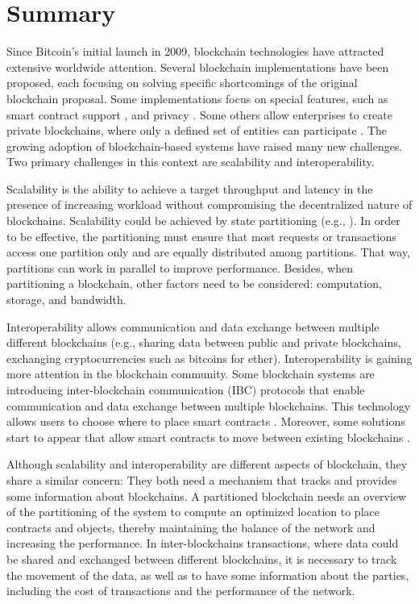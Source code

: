 \newpage
\thispagestyle{empty}
\section{Summary}
Since Bitcoin's initial launch in 2009, blockchain technologies have attracted
extensive worldwide attention. Several blockchain implementations
have been proposed, each focusing on solving specific shortcomings of the original
blockchain proposal. Some implementations focus on special features, such as
smart contract support \cite{buterin2013ethereum, elrom2019neo}, and privacy
\cite{alonso2018monero}. Some others allow enterprises to create private
blockchains, where only a defined set of entities can participate
\cite{androulaki2018hyperledger}. The growing adoption of blockchain-based
systems have raised many new challenges. Two primary challenges in this context
are scalability and interoperability. 

Scalability is the ability to achieve a target throughput and latency in the
presence of increasing workload without compromising the decentralized nature of
blockchains. Scalability could be achieved by state partitioning (e.g.,
\cite{facebookTAO, sciascia2012sdur, aguilera2007sinfonia}). In order to be effective, the
partitioning must ensure that most requests or transactions access one
partition only and are equally distributed among partitions. That way,
partitions can work in parallel to improve performance. Besides, when partitioning a blockchain, other factors need to be
considered: computation, storage, and bandwidth. 

Interoperability allows communication and data exchange between multiple
different blockchains (e.g., sharing data between public and private
blockchains, exchanging cryptocurrencies such as bitcoins for ether).
Interoperability is gaining more attention in the blockchain community. Some
blockchain systems are introducing inter-blockchain communication (IBC)
protocols that enable communication and data exchange between multiple
blockchains.
This technology allows users to choose where to place smart contracts
\cite{kwon2016cosmos, thomas2015protocol, kokoris2018omniledger,
al2017chainspace}. Moreover, some solutions start to appear that allow smart
contracts to move between existing blockchains \cite{fynn2020move, back2014enabling,
herlihy2018atomic}. 

Although scalability and interoperability are different aspects of blockchain, they
share a similar concern: They both need a mechanism that tracks and
provides some information about blockchains. A partitioned blockchain needs
an overview of the partitioning of the system to compute an optimized location
to place contracts and objects, thereby maintaining the balance of the network
and increasing the performance. In inter-blockchains transactions, where data
could be shared and exchanged between different blockchains, it is necessary to
track the movement of the data, as well as to have some information about the
parties, including the cost of transactions and the performance of the network.

